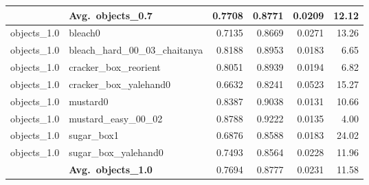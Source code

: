 \begin{longtable}{llrrrr}
  \cmidrule{2-6}
  & \textbf{Avg.~objects_0.7} & 0.7708 & 0.8771 & 0.0209 & 12.12 \\
  \midrule
  objects_1.0 & bleach0 & 0.7135 & 0.8669 & 0.0271 & 13.26 \\
  objects_1.0 & bleach\_hard\_00\_03\_chaitanya & 0.8188 & 0.8953 & 0.0183 & 6.65 \\
  objects_1.0 & cracker\_box\_reorient & 0.8051 & 0.8939 & 0.0194 & 6.82 \\
  objects_1.0 & cracker\_box\_yalehand0 & 0.6632 & 0.8241 & 0.0523 & 15.27 \\
  objects_1.0 & mustard0 & 0.8387 & 0.9038 & 0.0131 & 10.66 \\
  objects_1.0 & mustard\_easy\_00\_02 & 0.8788 & 0.9222 & 0.0135 & 4.00 \\
  objects_1.0 & sugar\_box1 & 0.6876 & 0.8588 & 0.0183 & 24.02 \\
  objects_1.0 & sugar\_box\_yalehand0 & 0.7493 & 0.8564 & 0.0228 & 11.96 \\
  \cmidrule{2-6}
  & \textbf{Avg.~objects_1.0} & 0.7694 & 0.8777 & 0.0231 & 11.58 \\
  \midrule
\bottomrule
\end{longtable}